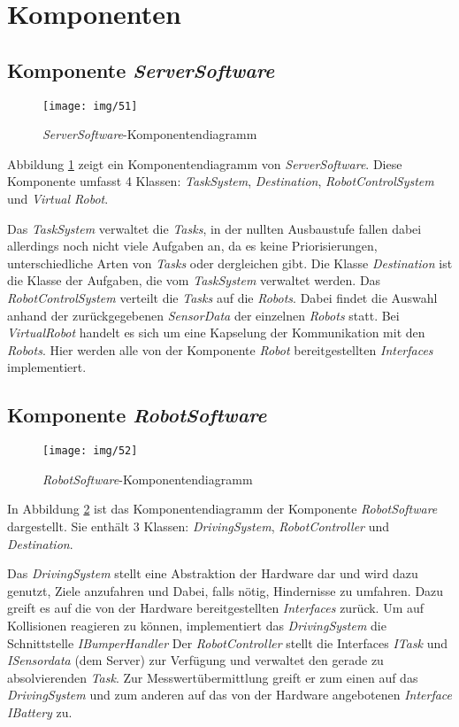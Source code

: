 \section{Komponenten}

\subsection{Komponente \textit{ServerSoftware}}
\begin{figure}[H]
\centering
\texttt{[image: img/51]}
\caption{\emph{ServerSoftware}-Komponentendiagramm}
\label{KomponentenStruktur1}
\end{figure}
Abbildung \ref{KomponentenStruktur1} zeigt ein Komponentendiagramm von \emph{ServerSoftware}. Diese Komponente umfasst 4 Klassen: \textit{TaskSystem}, \textit{Destination}, \textit{RobotControlSystem} und \textit{Virtual Robot}.


Das \textit{TaskSystem} verwaltet die \textit{Tasks}, in der nullten Ausbaustufe fallen dabei allerdings noch nicht viele Aufgaben an, 
da es keine Priorisierungen, unterschiedliche Arten von \textit{Tasks} oder dergleichen gibt. Die Klasse \textit{Destination} ist die Klasse 
der Aufgaben, die vom \textit{TaskSystem} verwaltet werden. Das \textit{RobotControlSystem} verteilt die \textit{Tasks} auf die \textit{Robots}. 
Dabei findet die Auswahl anhand der zurückgegebenen \textit{SensorData} der einzelnen \textit{Robots} statt. Bei \textit{VirtualRobot} handelt 
es sich um eine Kapselung der Kommunikation mit den \textit{Robots}. Hier werden alle von der Komponente \textit{Robot} bereitgestellten 
\textit{Interfaces} implementiert.
\subsection{Komponente \textit{RobotSoftware}}
\begin{figure}[H]
\centering
\texttt{[image: img/52]}
\caption{\emph{RobotSoftware}-Komponentendiagramm}
\label{KomponentenStruktur2}
\end{figure}
In Abbildung \ref{KomponentenStruktur2} ist das Komponentendiagramm der Komponente \textit{RobotSoftware} dargestellt. Sie enthält 3 Klassen: \textit{DrivingSystem}, \textit{RobotController} und \textit{Destination}. 


Das \textit{DrivingSystem} stellt eine Abstraktion der Hardware dar und wird dazu genutzt, Ziele anzufahren und Dabei, 
falls nötig, Hindernisse zu umfahren. Dazu greift es auf die von der Hardware bereitgestellten \textit{Interfaces} zurück. 
Um auf Kollisionen reagieren zu können, implementiert das \textit{DrivingSystem} die Schnittstelle \textit{IBumperHandler}
Der \textit{RobotController} stellt die Interfaces \textit{ITask} und \textit{ISensordata} (dem Server) zur Verfügung und verwaltet den gerade 
zu absolvierenden \textit{Task}. Zur Messwertübermittlung greift er zum einen auf das \textit{DrivingSystem} und zum anderen auf das 
von der Hardware angebotenen \textit{Interface} \textit{IBattery} zu.

